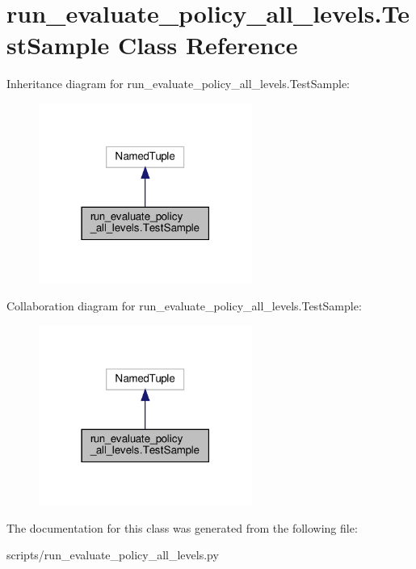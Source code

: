 \hypertarget{classrun__evaluate__policy__all__levels_1_1TestSample}{}\section{run\+\_\+evaluate\+\_\+policy\+\_\+all\+\_\+levels.\+Test\+Sample Class Reference}
\label{classrun__evaluate__policy__all__levels_1_1TestSample}


Inheritance diagram for run\+\_\+evaluate\+\_\+policy\+\_\+all\+\_\+levels.\+Test\+Sample\+:
\nopagebreak
\begin{figure}[H]
\begin{center}
\leavevmode
\includegraphics[width=198pt]{classrun__evaluate__policy__all__levels_1_1TestSample__inherit__graph}
\end{center}
\end{figure}


Collaboration diagram for run\+\_\+evaluate\+\_\+policy\+\_\+all\+\_\+levels.\+Test\+Sample\+:
\nopagebreak
\begin{figure}[H]
\begin{center}
\leavevmode
\includegraphics[width=198pt]{classrun__evaluate__policy__all__levels_1_1TestSample__coll__graph}
\end{center}
\end{figure}


The documentation for this class was generated from the following file\+:\begin{DoxyCompactItemize}
\item 
scripts/run\+\_\+evaluate\+\_\+policy\+\_\+all\+\_\+levels.\+py\end{DoxyCompactItemize}
